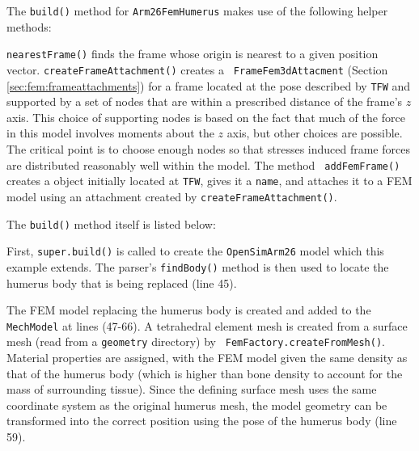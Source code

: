 The {\tt build()} method for {\tt Arm26FemHumerus} makes use of the following
helper methods:
%
\lstset{numbers=left} 
\iflatexml

\else
{}

\fi
\lstset{numbers=none}

{\tt nearestFrame()} finds the frame whose origin is nearest to a given
position vector. {\tt createFrameAttachment()} creates a {\tt
FrameFem3dAttacment} (Section \ref{sec:fem:frameattachments}) for a frame
located at the pose described by {\tt TFW} and supported by a set of nodes that
are within a prescribed distance of the frame's $z$ axis.  This choice of
supporting nodes is based on the fact that much of the force in this model
involves moments about the $z$ axis, but other choices are possible.  The
critical point is to choose enough nodes so that stresses induced frame forces
are distributed reasonably well within the model. The method {\tt
addFemFrame()} creates a  object initially located at
{\tt TFW}, gives it a {\tt name}, and attaches it to a FEM model using an
attachment created by {\tt createFrameAttachment()}.

The {\tt build()} method itself is listed below:
%
\lstset{numbers=left} 
\iflatexml

\else
{}

\fi
\lstset{numbers=none}
%
First, {\tt super.build()} is called to create the {\tt OpenSimArm26} model
which this example extends. The parser's {\tt findBody()} method is then used
to locate the humerus body that is being replaced (line 45).

The FEM model replacing the humerus body is created and added to the {\tt
MechModel} at lines (47-66). A tetrahedral element mesh is created from a
surface mesh (read from a {\tt geometry} directory) by {\tt
FemFactory.createFromMesh()}. Material properties are assigned, with the FEM
model given the same density as that of the humerus body (which is higher than
bone density to account for the mass of surrounding tissue). Since the defining
surface mesh uses the same coordinate system as the original humerus mesh, the
model geometry can be transformed into the correct position using the pose of
the humerus body (line 59).

